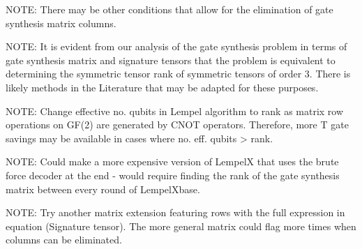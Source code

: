 \documentclass{article}
\theoremstyle{definition}
\theoremstyle{problem}
\theoremstyle{lemma}
\begin{document}
			NOTE: There may be other conditions that allow for the elimination of gate synthesis matrix columns.
			
			NOTE: It is evident from our analysis of the gate synthesis problem in terms of gate synthesis matrix and signature tensors that the problem is equivalent to determining the symmetric tensor rank of symmetric tensors of order 3. There is likely methods in the Literature that may be adapted for these purposes.
			
			NOTE: Change effective no. qubits in Lempel algorithm to rank as matrix row operations on GF(2) are generated by CNOT operators. Therefore, more T gate savings may be available in cases where no. eff. qubits > rank.
			
			NOTE: Could make a more expensive version of LempelX that uses the brute force decoder at the end - would require finding the rank of the gate synthesis matrix between every round of LempelXbase.
			
			NOTE: Try another matrix extension featuring rows with the full expression in equation (Signature tensor). The more general matrix could flag more times when columns can be eliminated.
			
			
\end{document}

